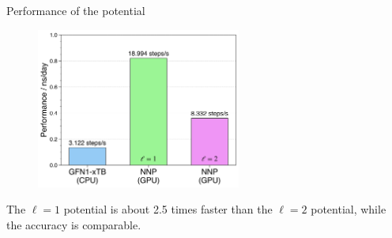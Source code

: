 \documentclass[11pt,t]{beamer}
\begin{document}
\begin{frame}{Performance of the potential}
	\vspace{-10pt}
	\begin{figure}
		\centering
		\includegraphics[width=0.6\textwidth]{Figures/results_performance_comparison.png}
	\end{figure}
	\small
	The $\ell = 1$ potential is about 2.5 times faster than the $\ell = 2$ potential, while the accuracy is comparable.
\end{frame}
\end{document}
